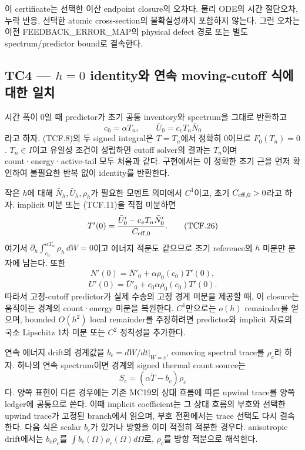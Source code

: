 이 certificate는 선택한 이산 endpoint closure의 오차다. 물리 ODE의 시간 절단오차, 누락 반응, 선택한 atomic cross-section의 불확실성까지 포함하지 않는다. 그런 오차는 이전 FEEDBACK\_ERROR\_MAP의 physical defect 경로 또는 별도 spectrum/predictor bound로 결속한다.

\hypertarget{tc4-h0-identityuxc640-uxc5f0uxc18d-moving-cutoff-uxc2dduxc5d0-uxb300uxd55c-uxc77cuxce58}{%
\subsection{\texorpdfstring{TC4 --- \(h=0\) identity와 연속 moving-cutoff 식에 대한 일치}{TC4 --- h=0 identity와 연속 moving-cutoff 식에 대한 일치}}\label{tc4-h0-identityuxc640-uxc5f0uxc18d-moving-cutoff-uxc2dduxc5d0-uxb300uxd55c-uxc77cuxce58}}

시간 폭이 0일 때 predictor가 초기 공통 inventory와 spectrum을 그대로 반환하고 \[
c_0=\alpha T_n,\qquad
\bar U_0=c_vT_n\bar N_0
\tag{TCF.25}
\] 라고 하자. (TCF.8)의 두 signed integral은 \(T=T_n\)에서 정확히 0이므로 \(F_0(T_n)=0\). \(T_n\in I\)이고 유일성 조건이 성립하면 cutoff solver의 결과는 \(T_n\)이며 count·energy·active-tail 모두 처음과 같다. 구현에서는 이 정확한 초기 근을 먼저 확인하여 불필요한 반복 없이 identity를 반환한다.

작은 \(h\)에 대해 \(\bar N_h,\bar U_h,\rho_h\)가 필요한 모멘트 의미에서 \(C^1\)이고, 초기 \(C_{\rm eff,0}>0\)라고 하자. implicit 미분 또는 (TCF.11)을 직접 미분하면 \[
T'(0)=
\frac{\bar U'_0-c_vT_n\bar N'_0}{C_{\rm eff,0}} .
\tag{TCF.26}
\] 여기서 \(\partial_h\int_{c_0}^{\alpha T_n}\rho_h\,dW=0\)이고 에너지 적분도 같으므로 초기 reference의 \(h\) 미분만 분자에 남는다. 또한 \[
N'(0)=\bar N'_0+\alpha\rho_0(c_0)T'(0),
\] \[
U'(0)=\bar U'_0+c_0\alpha\rho_0(c_0)T'(0).
\tag{TCF.27}
\] 따라서 고정-cutoff predictor가 실제 수송의 고정 경계 미분을 제공할 때, 이 closure는 움직이는 경계의 count·energy 미분을 복원한다. \(C^1\)만으로는 \(o(h)\) remainder를 얻으며, bounded \(O(h^2)\) local remainder를 주장하려면 predictor와 implicit 자료의 국소 Lipschitz 1차 미분 또는 \(C^2\) 정칙성을 추가한다.

연속 에너지 drift의 경계값을 \(b_c=dW/dt|_{W=c}\), comoving spectral trace를 \(\rho_c\)라 하자. 하나의 연속 spectrum이면 경계의 signed thermal count source는 \[
S_c=(\alpha\dot T-b_c)\rho_c
\tag{TCF.28}
\] 다. 양쪽 표현이 다른 경우에는 기존 MC19의 상대 흐름에 따른 upwind trace를 양쪽 ledger에 공통으로 쓴다. 이때 implicit coefficient는 그 상대 흐름의 부호와 선택한 upwind trace가 고정된 branch에서 읽으며, 부호 전환에서는 trace 선택도 다시 결속한다. 다음 식은 scalar \(b_c\)가 있거나 방향을 이미 적절히 적분한 경우다. anisotropic drift에서는 \(b_c\rho_c\)를 \(\int b_c(\Omega)\rho_c(\Omega)d\Omega\)로, \(\rho_c\)를 방향 적분으로 해석한다.

